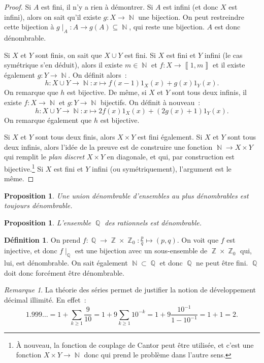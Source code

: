 \documentclass{article}
\DeclareMathOperator{\N}{\mathbb N}
\DeclareMathOperator{\Q}{\mathbb Q}
\DeclareMathOperator{\Z}{\mathbb Z}
\newcommand{\intint}[2]{\left\llbracket#1, #2\right\rrbracket}  %
\newtheorem{prp}[thm]{Proposition}
\theoremstyle{definition}
\newtheorem{déf}[thm]{Définition}
\theoremstyle{remark}
\newtheorem*{rmq}{Remarque}
\begin{document}
		\begin{proof} Si $A$ est fini, il n'y a rien à démontrer. Si $A$ est infini (et donc $X$ est infini), alors on sait qu'il existe $g : X \to \N$ une
		bijection. On peut restreindre cette bijection à $g{\mid_A} : A \to g(A) \subseteq \N$, qui reste une bijection. $A$ est donc dénombrable.

		Si $X$ et $Y$ sont finis, on sait que $X \cup Y$ est fini. Si $X$ est fini et $Y$ infini (le cas symétrique s'en déduit), alors il existe $m \in \N$ et
		$f : X \to \intint 1m$ et il existe également $g : Y \to \N$. On définit alors~:
		\[h : X \cup Y \to \N : x \mapsto f(x-1)1_X(x) + g(x)1_Y(x).\]
		On remarque que $h$ est bijective. De même, si $X$ et $Y$ sont tous deux infinis, il existe $f : X \to \N$ et $g : Y \to \N$ bijectifs. On définit
		à nouveau~:
		\[h : X \cup Y \to \N : x \mapsto 2f(x)1_X(x) + (2g(x)+1)1_Y(x).\]
		On remarque également que $h$ est bijective.

		Si $X$ et $Y$ sont tous deux finis, alors $X \times Y$ est fini également. Si $X$ et $Y$ sont tous deux infinis, alors l'idée de la preuve est de
		construire une fonction $\N \to X \times Y$ qui remplit le \emph{plan discret} $X \times Y$ en diagonale, et qui, par construction est bijective.\footnote{
		À nouveau, la fonction de couplage de Cantor peut être utilisée, et c'est une fonction $X \times Y \to \N$ donc qui prend le problème dans l'autre sens.}
		Si $X$ est fini et $Y$ infini (ou symétriquement), l'argument est le même.
		\end{proof}

		\begin{prp} Une union dénombrable d'ensembles au plus dénombrables est toujours dénombrable. \end{prp}

		\begin{prp} L'ensemble $\Q$ des rationnels est dénombrable. \end{prp}

		\begin{déf} On prend $f : \Q \to \Z \times \Z_0 : \frac pq \mapsto (p, q)$. On voit que $f$ est injective, et donc $f{\mid_{\Q}}$ est une bijection
		avec un sous-ensemble de $\Z \times \Z_0$ qui, lui, est dénombrable. On sait également $\N \subset \Q$ et donc $\Q$ ne peut être fini.
		$\Q$ doit donc forcément être dénombrable.
		\end{déf}

		\begin{rmq} La théorie des séries permet de justifier la notion de développement décimal illimité. En effet~:
		\[1.999\ldots = 1 + \sum_{k \geq 1}\frac 9{10} = 1 + 9\sum_{k \geq 1}10^{-k} = 1 + 9\frac {10^{-1}}{1 - 10^{-1}} = 1 + 1 = 2.\]
		\end{rmq}
\end{document}

